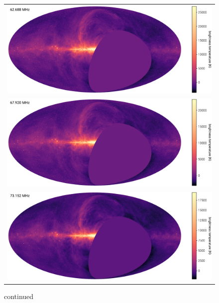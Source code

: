 \documentclass[twocolumn]{aastex61}
\begin{document}
\addtocounter{figure}{-1}
\begin{figure}[p]
    \centering
    \begin{tabular}{c}
        \includegraphics[height=0.32\textheight]{figures/channel-maps/spw14} \\
        \includegraphics[height=0.32\textheight]{figures/channel-maps/spw16} \\
        \includegraphics[height=0.32\textheight]{figures/channel-maps/spw18} \\
    \end{tabular}
    \caption{
        continued
    }
\end{figure}
\end{document}
